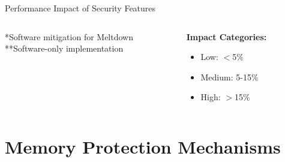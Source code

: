 \documentclass[aspectratio=169,12pt]{beamer}
\begin{document}
\begin{frame}{Performance Impact of Security Features}
    \vspace{0.3cm}
    \begin{columns}
        \begin{column}{0.5\textwidth}
            \small
            *Software mitigation for Meltdown\\
            **Software-only implementation
        \end{column}
        \begin{column}{0.5\textwidth}
            \begin{tcolorbox}[colback=yellow!10]
                \small
                \textbf{Impact Categories:}
                \begin{itemize}
                    \item \textcolor{green!70!black}{Low}: $<$5\%
                    \item \textcolor{yellow!70!black}{Medium}: 5-15\%
                    \item \textcolor{orange!70!black}{High}: $>$15\%
                \end{itemize}
            \end{tcolorbox}
        \end{column}
    \end{columns}
\end{frame}

\section{Memory Protection Mechanisms}
\end{document}
